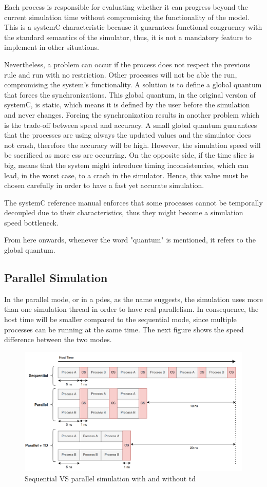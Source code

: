 Each process is responsible for evaluating whether it can progress beyond the current simulation time without compromising the functionality of the model. This is a systemC characteristic because it guarantees functional congruency with the standard semantics of the simulator, thus, it is not a mandatory feature to implement in other situations. 

Nevertheless, a problem can occur if the process does not respect the previous rule and run with no restriction. Other processes will not be able the run, compromising the system's functionality. A solution is to define a global quantum that forces the synchronizations. This global quantum, in the original version of systemC, is static, which means it is defined by the user before the simulation and never changes. Forcing the synchronization results in another problem which is the trade-off between speed and accuracy. A small global quantum guarantees that the processes are using always the updated values and the simulator does not crash, therefore the accuracy will be high. However, the simulation speed will be sacrificed as more \glspl{cs} are occurring. On the opposite side, if the time slice is big, means that the system might introduce timing inconsistencies, which can lead, in the worst case, to a crash in the simulator. Hence, this value must be chosen carefully in order to have a fast yet accurate simulation.  

The systemC reference manual \cite{systemC} enforces that some processes cannot be temporally decoupled due to their characteristics, thus they might become a simulation speed bottleneck. 

From here onwards, whenever the word "quantum" is mentioned, it refers to the global quantum.

\subsection{Parallel Simulation}

In the parallel mode, or in a \gls{pdes}, as the name suggests, the simulation uses more than one simulation thread in order to have real parallelism. In consequence, the host time will be smaller compared to the sequential mode, since multiple processes can be running at the same time. The next figure shows the speed difference between the two modes.

\begin{figure}[H]
	\centering
 	\includegraphics[width=0.8\linewidth]{Images/ParallelSimulation.png}
 	\caption{Sequential VS parallel simulation with and without \gls{td}}
	 \label{fig_ParallelSimulation}
\end{figure}

